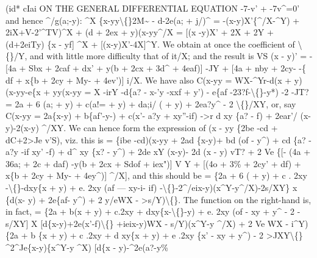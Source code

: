 \documentclass[12pt,a4paper]{article}
\begin{document}
(id*
cIai
ON THE GENERAL DIFFERENTIAL EQUATION
-7-v' + -7v\textasciicircum{}=0'
and hence
\textasciicircum{}/g(a;-y)\textbullet{}:
\textasciicircum{}X \{x-yy\textbackslash\{\}2M\textasciitilde{} - d-2e(a; + j/)\textasciicircum{}
= -(x-y)X'\{\textasciicircum{}/X-\textasciicircum{}Y) + 2iX+V-2'\textasciicircum{}TV)\textasciicircum{}X
+ (d + 2ex + y)(x-yy\textasciicircum{}/X
=
[(x -y)X' + 2X + 2Y + (d+2eiTy) \{x - yf] \textasciicircum{}X
+ [(x-y)X'-4X]\textasciicircum{}Y.
We
obtain
at
once
the
coefficient
of
\textbackslash\{\}/Y, and
with
little
more
difficulty
that
of
it/X;
and the
result
is
VS (x - y)' = - [4a + Sbx + 2caf + dx' + y(b + 2cx + 3d\textasciicircum{} + 4eaf)] -JY
+ [4a + nby + 2cy- -\{ df + x\{b + 2cy + My- + 4ev')] i/X.
We have
also
C(x-yy = WX-\textasciicircum{}Yr-d(x + y)(x-yy-e\{x + yy(x-yy
= X -irY -d\{a? - x-'y -xxf + y') - e\{af -23?f-\textbackslash\{\}-y*) -2 -JT?
= 2a + 6 (a; + y) + c(a!= + y\guillemotright{}) + da;i/ (\guillemotleft{} + y) + 2ea?y\textasciicircum{} - 2 \textbackslash\{\}/XY,
or, say
C(x-yy = 2a\{x-y) + b\{af'-y-) + c(x'- a?y + xy''-if)
->r d xy \{a? - f)
+ 2ear'\guillemotleft{}/\guillemotright{} (x-y)-2(x-y) \textasciicircum{}/XY.
We can hence form
the expression of
(x - yy \{2be -cd + dC+2>Je v'S),
viz.
this
is
= \{ibe -cd)(x-yy + 2ad \{x-y)+ bd (of - y\textasciicircum{}) + cd \{a? - a?y -if xy' -f) + d\textasciicircum{} xy \{x? - y\textasciicircum{})
+ 2de xY (x-y)- 2d (x - y) vT?
+ 2 Ve \{[- (4a + 36a; + 2c\guillemotleft{}\guillemotright{} + daf) -y(b + 2cx + Sdof + iex")] V Y
+ [(4o + 3\% + 2cy' + df) + x\{b + 2cy + My- + 4ey\textasciicircum{})] \textasciicircum{}/X],
and
this should be
= \{2a + 6 (\guillemotleft{} + y) + c
. 2xy -\textbackslash\{\}-dxy\{x + y) + e. 2xy (af --- xy-i- if)
-\textbackslash\{\}-2\textasciicircum{}/eix-y)(x\textasciicircum{}Y-y\textasciicircum{}/X)-2s/XY\} x \{d(x- y) + 2e\{af- y\textasciicircum{}) + 2 y/eWX - >s/Y)\textbackslash\{\}.
The function on the right-hand
is, in
fact,
= \{2a + b(x + y) + c.2xy + dxy\{x-\textbackslash\{\}-y) + e. 2xy (of - xy + y\textasciicircum{} - 2 -s/XY]
X [d\{x-y)+2e(x'-f)\textbackslash\{\} +ieix-y)WX - s/Y)(x\textasciicircum{}Y-y \textasciicircum{}/X)
+ 2 Ve WX - i\textasciicircum{}Y) \{2a + b \{x + y) + c .2xy + d xy\{x + y) + e .2xy \{x' - xy + y\textasciicircum{}) - 2 >JXY\textbackslash\{\}
\textasciicircum{}2\textasciicircum{}Je\{x-y)\{x\textasciicircum{}Y-y \textasciicircum{}X) [d\{x - y)-\textasciicircum{}2e(a?-y\%
\end{document}
